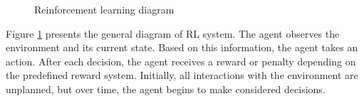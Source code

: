  
\begin{figure} [H]
	\centering
 \caption{Reinforcement learning diagram}
 \label{fig:RL_diagram}
\end{figure}
Figure \ref{fig:RL_diagram} presents the general diagram of RL system. The agent observes the environment and its current state. Based on this information, the agent takes an action. After each decision, the agent receives a reward or penalty depending on the predefined reward system. Initially, all interactions with the environment are unplanned, but over time, the agent begins to make considered decisions.

